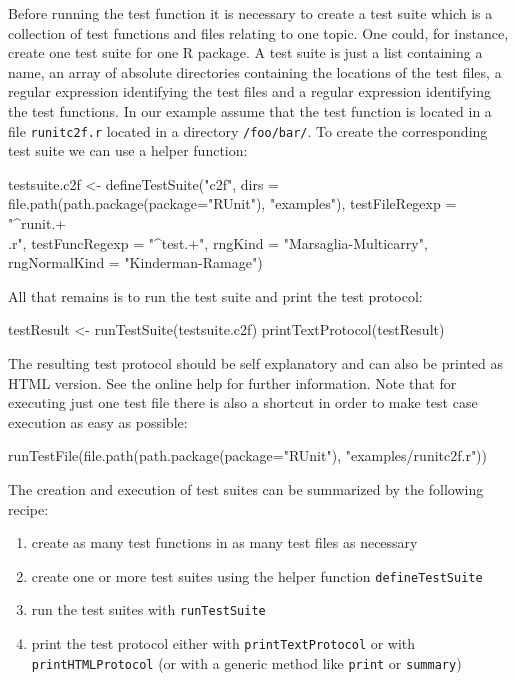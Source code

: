 \documentclass[12pt, a4paper]{article}
\begin{document}
Before running the test function it is necessary to create a test suite which is a collection of test functions and files relating to one topic. One could, for instance, create one test suite for one R package. A test suite is just a list containing a name, an array of absolute directories containing the locations of the test files, a regular expression identifying the test files and a regular expression identifying the test functions. In our example assume that the test function is located in a file {\tt runitc2f.r} located in a directory {\tt /foo/bar/}. To create the corresponding test suite we can use a helper function:
\begin{Sinput}
testsuite.c2f <- defineTestSuite("c2f",
                 dirs = file.path(path.package(package="RUnit"),
                            "examples"),
                 testFileRegexp = "^runit.+\\.r",
                 testFuncRegexp = "^test.+",
                 rngKind = "Marsaglia-Multicarry",
                 rngNormalKind = "Kinderman-Ramage")
\end{Sinput}
All that remains is to run the test suite and print the test protocol:
\begin{Sinput}
testResult <- runTestSuite(testsuite.c2f)
printTextProtocol(testResult)
\end{Sinput}
The resulting test protocol should be self explanatory and can also be printed as HTML version. See the online help for further information.
Note that for executing just one test file there is also a shortcut in order to make test case execution as easy as possible:
 \begin{Sinput}
runTestFile(file.path(path.package(package="RUnit"),
            "examples/runitc2f.r"))
\end{Sinput}

The creation and execution of test suites can be summarized by the following recipe:
\begin{enumerate}
\item{create as many test functions in as many test files as necessary }
\item{create one or more test suites using the helper function {\tt defineTestSuite}}
\item{run the test suites with {\tt runTestSuite}}
\item{print the test protocol either with {\tt printTextProtocol} or with {\tt printHTMLProtocol} (or with a generic method like {\tt print} or {\tt summary})}
\end{enumerate}
\end{document}
